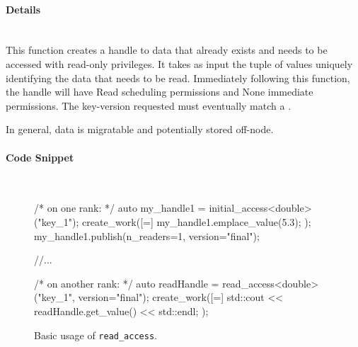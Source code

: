 \paragraph{Details}\mbox{}\\
This function creates a handle to data that already exists and 
needs to be accessed with read-only privileges. 
It takes as input the tuple of values uniquely 
identifying the data that needs to be read.
Immediately following this function, the handle will have Read scheduling permissions
and None immediate permissions.
The key-version requested must eventually match a .

In general,  data is migratable and potentially stored off-node.

\paragraph{Code Snippet}\mbox{}\\
\begin{figure}[!h]
\begin{CppCodeNumb}
/* on one rank: */
auto my_handle1 = initial_access<double>("key_1");
create_work([=]{
  my_handle1.emplace_value(5.3);
});
my_handle1.publish(n_readers=1, version="final");

//...

/* on another rank: */
auto readHandle = read_access<double>("key_1", version="final");
create_work([=]{
  std::cout << readHandle.get_value() << std::endl;
});
\end{CppCodeNumb}
\label{fig:fe_api_readaccess}
\caption{Basic usage of \texttt{read\_access}.}
\end{figure}

